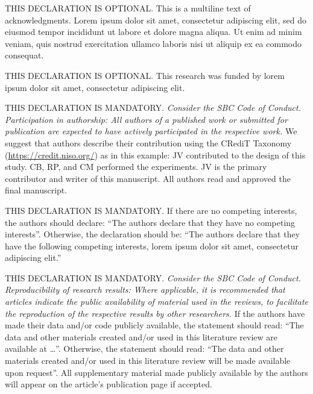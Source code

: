 \documentclass[english]{sbcreviews-2025}%
\begin{document}
\begin{declarations}

\begin{acknowledgements}
THIS DECLARATION IS OPTIONAL. 
This is a multiline text of acknowledgments. 
Lorem ipsum dolor sit amet, consectetur adipiscing elit, 
sed do eiusmod tempor incididunt ut labore et dolore magna aliqua. 
Ut enim ad minim veniam, quis nostrud exercitation ullamco laboris nisi ut aliquip ex ea commodo consequat.
\end{acknowledgements}

\begin{funding}
THIS DECLARATION IS OPTIONAL. This research was funded by lorem ipsum dolor sit amet, consectetur adipiscing elit.
\end{funding}

\begin{contributions}
THIS DECLARATION IS MANDATORY. 
\textit{Consider the SBC Code of Conduct.
Participation in authorship: All authors of a published work
or submitted for publication are expected to have actively participated in the respective work.}
We suggest that authors describe their contribution using
the CRediT Taxonomy (\href{https://credit.niso.org/}{https://credit.niso.org/}) as in this example:
JV contributed to the design of this study. CB, RP, and CM performed the experiments.
JV is the primary contributor and writer of this manuscript.
All authors read and approved the final manuscript.
\end{contributions}

\begin{interests}
THIS DECLARATION IS MANDATORY. If there are no competing interests, the authors should declare: ``The authors declare that they have no competing interests''. Otherwise, the declaration should be: ``The authors declare that they have the following competing interests, lorem ipsum dolor sit amet, consectetur adipiscing elit.''
\end{interests}

\begin{materials}
THIS DECLARATION IS MANDATORY. 
\textit{Consider the SBC Code of Conduct.
Reproducibility of research results:
Where applicable, it is recommended that articles indicate
the public availability of material used in the reviews,
to facilitate the reproduction of the respective results by other researchers.}
%
If the authors have made their data and/or code publicly available, the statement should read:
``The data and other materials created and/or used in this literature review
are available at \ldots''.
Otherwise, the statement should read:
``The data and other materials created and/or used in this literature review
will be made available upon request''.
%
All supplementary material made publicly available by the authors will appear
on the article's publication page if accepted.
\end{materials}


\end{declarations}
\end{document}
